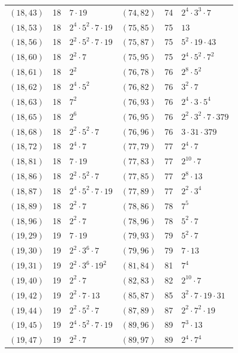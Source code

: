 \documentclass[11pt]{article}
\begin{document}
\begin{longtable}{@{}lrl@{\qquad}lrl@{}}
$(18,43)$ & 18 & $7\cdot 19$ & $(74,82)$ & 74 & $2^{4}\cdot 3^{3}\cdot 7$\\
$(18,53)$ & 18 & $2^{4}\cdot 5^{2}\cdot 7\cdot 19$ & $(75,85)$ & 75 & $13$\\
$(18,56)$ & 18 & $2^{2}\cdot 5^{2}\cdot 7\cdot 19$ & $(75,87)$ & 75 & $5^{2}\cdot 19\cdot 43$\\
$(18,60)$ & 18 & $2^{2}\cdot 7$ & $(75,95)$ & 75 & $2^{4}\cdot 5^{2}\cdot 7^{2}$\\
$(18,61)$ & 18 & $2^{2}$ & $(76,78)$ & 76 & $2^{8}\cdot 5^{2}$\\
$(18,62)$ & 18 & $2^{4}\cdot 5^{2}$ & $(76,82)$ & 76 & $3^{2}\cdot 7$\\
$(18,63)$ & 18 & $7^{2}$ & $(76,93)$ & 76 & $2^{4}\cdot 3\cdot 5^{4}$\\
$(18,65)$ & 18 & $2^{6}$ & $(76,95)$ & 76 & $2^{2}\cdot 3^{2}\cdot 7\cdot 379$\\
$(18,68)$ & 18 & $2^{2}\cdot 5^{2}\cdot 7$ & $(76,96)$ & 76 & $3\cdot 31\cdot 379$\\
$(18,72)$ & 18 & $2^{4}\cdot 7$ & $(77,79)$ & 77 & $2^{4}\cdot 7$\\
$(18,81)$ & 18 & $7\cdot 19$ & $(77,83)$ & 77 & $2^{10}\cdot 7$\\
$(18,86)$ & 18 & $2^{2}\cdot 5^{2}\cdot 7$ & $(77,85)$ & 77 & $2^{8}\cdot 13$\\
$(18,87)$ & 18 & $2^{4}\cdot 5^{2}\cdot 7\cdot 19$ & $(77,89)$ & 77 & $2^{2}\cdot 3^{4}$\\
$(18,89)$ & 18 & $2^{2}\cdot 7$ & $(78,86)$ & 78 & $7^{5}$\\
$(18,96)$ & 18 & $2^{2}\cdot 7$ & $(78,96)$ & 78 & $5^{2}\cdot 7$\\
$(19,29)$ & 19 & $7\cdot 19$ & $(79,93)$ & 79 & $5^{2}\cdot 7$\\
$(19,30)$ & 19 & $2^{2}\cdot 3^{6}\cdot 7$ & $(79,96)$ & 79 & $7\cdot 13$\\
$(19,31)$ & 19 & $2^{2}\cdot 3^{6}\cdot 19^{2}$ & $(81,84)$ & 81 & $7^{4}$\\
$(19,40)$ & 19 & $2^{2}\cdot 7$ & $(82,83)$ & 82 & $2^{10}\cdot 7$\\
$(19,42)$ & 19 & $2^{2}\cdot 7\cdot 13$ & $(85,87)$ & 85 & $3^{2}\cdot 7\cdot 19\cdot 31$\\
$(19,44)$ & 19 & $2^{2}\cdot 5^{2}\cdot 7$ & $(87,89)$ & 87 & $2^{2}\cdot 7^{2}\cdot 19$\\
$(19,45)$ & 19 & $2^{4}\cdot 5^{2}\cdot 7\cdot 19$ & $(89,96)$ & 89 & $7^{3}\cdot 13$\\
$(19,47)$ & 19 & $2^{2}\cdot 7$ & $(89,97)$ & 89 & $2^{4}\cdot 7^{4}$\\

\end{longtable}
\end{document}
